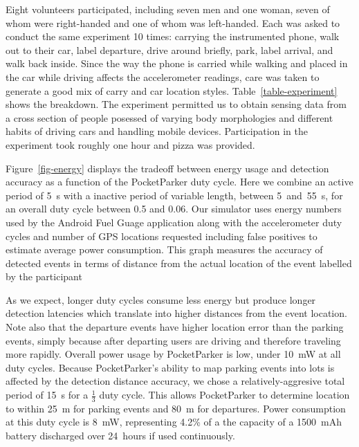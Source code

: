 Eight volunteers participated, including seven men and one woman, seven of
whom were right-handed and one of whom was left-handed. Each was asked to
conduct the same experiment 10 times: carrying the instrumented phone, walk
out to their car, label departure, drive around briefly, park, label arrival,
and walk back inside. Since the way the phone is carried while walking and
placed in the car while driving affects the accelerometer readings, care was
taken to generate a good mix of carry and car location styles.
Table~\ref{table-experiment} shows the breakdown. The experiment permitted us
to obtain sensing data from a cross section of people posessed of varying
body morphologies and different habits of driving cars and handling mobile
devices. Participation in the experiment took roughly one hour and pizza was
provided.

Figure~\ref{fig-energy} displays the tradeoff between energy usage and
detection accuracy as a function of the PocketParker duty cycle. Here we
combine an active period of 5~s with a inactive period of variable length,
between 5~and~55~s, for an overall duty cycle between 0.5 and 0.06. Our
simulator uses energy numbers used by the Android Fuel Guage application
along with the accelerometer duty cycles and number of GPS locations
requested including false positives to estimate average power consumption.
This graph measures the accuracy of detected events in terms of distance from
the actual location of the event labelled by the participant

As we expect, longer duty cycles consume less energy but produce longer
detection latencies which translate into higher distances from the event
location. Note also that the departure events have higher location error than
the parking events, simply because after departing users are driving and
therefore traveling more rapidly. Overall power usage by PocketParker is low,
under 10~mW at all duty cycles. Because PocketParker's ability to map parking
events into lots is affected by the detection distance accuracy, we chose a
relatively-aggresive total period of 15~s for a $\frac{1}{3}$ duty cycle.
This allows PocketParker to determine location to within 25~m for parking
events and 80~m for departures. Power consumption at this duty cycle is 8~mW,
representing 4.2\% of a the capacity of a 1500~mAh battery discharged over
24~hours if used continuously.

